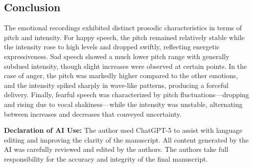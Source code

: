 \documentclass{article}
\begin{document}
\subsection{Conclusion}
The emotional recordings exhibited distinct prosodic characteristics in terms
of pitch and intensity. For happy speech, the pitch remained relatively stable
while the intensity rose to high levels and dropped swiftly, reflecting
energetic expressiveness. Sad speech showed a much lower pitch range with
generally subdued intensity, though slight increases were observed at certain
points. In the case of anger, the pitch was markedly higher compared to the
other emotions, and the intensity spiked sharply in wave-like patterns,
producing a forceful delivery. Finally, fearful speech was characterized by
pitch fluctuations—dropping and rising due to vocal shakiness—while the
intensity was unstable, alternating between increases and decreases that
conveyed uncertainty.




\vfill
{\footnotesize
    \noindent\textbf{Declaration of AI Use:} The author used ChatGPT-5 to 
    assist with language editing and improving the clarity of the manuscript. 
    All content generated by the AI was carefully reviewed and edited by the 
    authors. The authors take full responsibility for the accuracy and integrity 
    of the final manuscript.
    \par}
\end{document}
